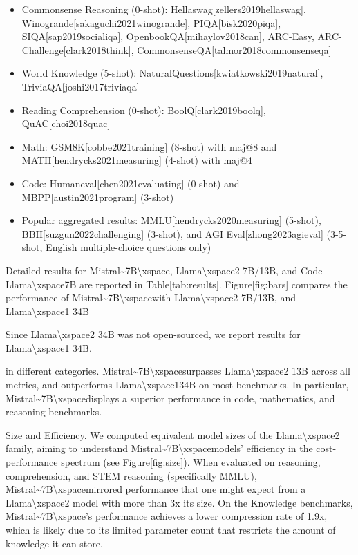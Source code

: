 \documentclass[11pt,a4paper]{article}
\begin{document}
\begin{itemize}
\item Commonsense Reasoning (0-shot): Hellaswag[zellers2019hellaswag], Winogrande[sakaguchi2021winogrande], PIQA[bisk2020piqa], SIQA[sap2019socialiqa], OpenbookQA[mihaylov2018can], ARC-Easy, ARC-Challenge[clark2018think], CommonsenseQA[talmor2018commonsenseqa]
\item World Knowledge (5-shot): NaturalQuestions[kwiatkowski2019natural], TriviaQA[joshi2017triviaqa]
\item Reading Comprehension (0-shot): BoolQ[clark2019boolq], QuAC[choi2018quac]
\item Math: GSM8K[cobbe2021training] (8-shot) with maj@8 and MATH[hendrycks2021measuring] (4-shot) with maj@4
\item Code: Humaneval[chen2021evaluating] (0-shot) and MBPP[austin2021program] (3-shot)
\item Popular aggregated results: MMLU[hendrycks2020measuring] (5-shot), BBH[suzgun2022challenging] (3-shot), and AGI Eval[zhong2023agieval] (3-5-shot, English multiple-choice questions only)
\end{itemize}

Detailed results for Mistral\textasciitilde{}7B\textbackslash{}xspace, Llama\textbackslash{}xspace2 7B/13B, and Code-Llama\textbackslash{}xspace7B are reported in Table[tab:results]. Figure[fig:bars] compares the performance of Mistral\textasciitilde{}7B\textbackslash{}xspacewith Llama\textbackslash{}xspace2 7B/13B, and Llama\textbackslash{}xspace1 34B

Since Llama\textbackslash{}xspace2 34B was not open-sourced, we report results for Llama\textbackslash{}xspace1 34B.

in different categories. Mistral\textasciitilde{}7B\textbackslash{}xspacesurpasses Llama\textbackslash{}xspace2 13B across all metrics, and outperforms Llama\textbackslash{}xspace134B on most benchmarks. In particular, Mistral\textasciitilde{}7B\textbackslash{}xspacedisplays a superior performance in code, mathematics, and reasoning benchmarks.

Size and Efficiency. We computed equivalent model sizes of the Llama\textbackslash{}xspace2 family, aiming to understand Mistral\textasciitilde{}7B\textbackslash{}xspacemodels' efficiency in the cost-performance spectrum (see Figure[fig:size]). When evaluated on reasoning, comprehension, and STEM reasoning (specifically MMLU), Mistral\textasciitilde{}7B\textbackslash{}xspacemirrored performance that one might expect from a Llama\textbackslash{}xspace2 model with more than 3x its size. On the Knowledge benchmarks, Mistral\textasciitilde{}7B\textbackslash{}xspace's performance achieves a lower compression rate of 1.9x, which is likely due to its limited parameter count that restricts the amount of knowledge it can store.
\end{document}
